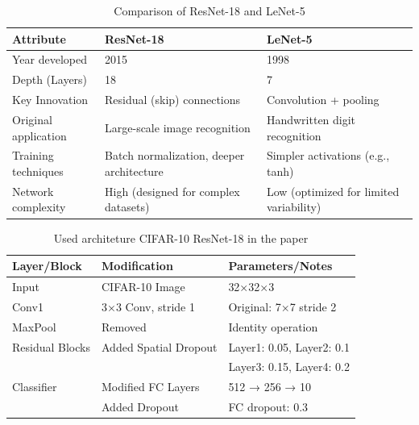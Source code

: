 \documentclass{article}
\begin{document}
\begin{table}[H]
\centering
\caption{Comparison of ResNet-18 and LeNet-5}
\label{tab:resnet182}
\begin{tabular}{l|l|l}
\hline
\textbf{Attribute} & \textbf{ResNet-18} & \textbf{LeNet-5} \\
\hline
Year developed         & 2015                          & 1998                          \\
\hline
Depth (Layers)         & 18                            & 7                             \\
\hline
Key Innovation         & Residual (skip) connections  & Convolution + pooling         \\
\hline
Original application   & Large-scale image recognition & Handwritten digit recognition \\
\hline
Training techniques    & Batch normalization, deeper architecture & Simpler activations (e.g., tanh) \\
\hline
Network complexity     & High (designed for complex datasets) & Low (optimized for limited variability) \\
\hline
\end{tabular}
\end{table}


\begin{table}[H]
\centering
\caption{Used architeture CIFAR-10 ResNet-18 in the paper}
\label{tab:resnet183}
\begin{tabular}{l|l|l}
\hline
\textbf{Layer/Block} & \textbf{Modification} & \textbf{Parameters/Notes} \\
\hline
Input & CIFAR-10 Image & 32×32×3 \\
\hline
Conv1 & 3×3 Conv, stride 1 & Original: 7×7 stride 2 \\
MaxPool & Removed & Identity operation \\
\hline
Residual Blocks & Added Spatial Dropout & Layer1: 0.05, Layer2: 0.1 \\
 &  & Layer3: 0.15, Layer4: 0.2 \\
\hline
Classifier & Modified FC Layers & 512 → 256 → 10 \\
 & Added Dropout & FC dropout: 0.3 \\
\hline
\end{tabular}
\end{table}
\end{document}
